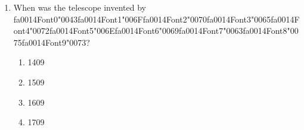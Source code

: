 \documentclass[12pt]{article}
\begin{document}
\begin{enumerate}[label=\arabic*.]
distance between the Earth and the Sun. How far is Altair from the Earth?
\begin{enumerate}[label=(\alph*)]
    \item 9.3 x 1013 meters
    \item 9.3 x 1010 meters
    \item 1.5 x 1014 meters
    \item 1.5 x 1017 meters
\end{enumerate}
\item When was the telescope invented by {\csname fa0014Font0\endcsname\char"0043}{\csname fa0014Font1\endcsname\char"006F}{\csname fa0014Font2\endcsname\char"0070}{\csname fa0014Font3\endcsname\char"0065}{\csname fa0014Font4\endcsname\char"0072}{\csname fa0014Font5\endcsname\char"006E}{\csname fa0014Font6\endcsname\char"0069}{\csname fa0014Font7\endcsname\char"0063}{\csname fa0014Font8\endcsname\char"0075}{\csname fa0014Font9\endcsname\char"0073}?
\begin{enumerate}[label=(\alph*)]
    \item 1409
    \item 1509
    \item 1609
    \item 1709
\end{enumerate}
\end{enumerate}
\end{document}
